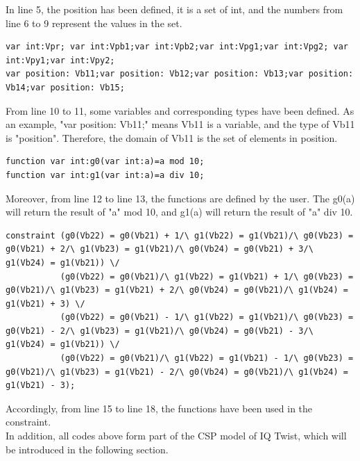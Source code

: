 In line 5, the position has been defined, it is a set of int, and the numbers from line 6 to 9 represent the values in the set.
\begin{lstlisting}[language=minizinc,firstnumber=10]
var int:Vpr; var int:Vpb1;var int:Vpb2;var int:Vpg1;var int:Vpg2; var int:Vpy1;var int:Vpy2;
var position: Vb11;var position: Vb12;var position: Vb13;var position: Vb14;var position: Vb15;
\end{lstlisting}
From line 10 to 11, some variables and corresponding types have been defined. As an example, "var position: Vb11;" means Vb11 is a variable, and the type of Vb11 is "position". Therefore, the domain of Vb11 is the set of elements in position.
\begin{lstlisting}[language=minizinc,firstnumber=12]
function var int:g0(var int:a)=a mod 10;
function var int:g1(var int:a)=a div 10;
\end{lstlisting}
Moreover, from line 12 to line 13, the functions are defined by the user. The g0(a) will return the result of "a" mod 10, and g1(a) will return the result of "a" div 10.
\begin{lstlisting}[language=minizinc,firstnumber=14]
%blue piece2 
constraint (g0(Vb22) = g0(Vb21) + 1/\ g1(Vb22) = g1(Vb21)/\ g0(Vb23) = g0(Vb21) + 2/\ g1(Vb23) = g1(Vb21)/\ g0(Vb24) = g0(Vb21) + 3/\ g1(Vb24) = g1(Vb21)) \/
           (g0(Vb22) = g0(Vb21)/\ g1(Vb22) = g1(Vb21) + 1/\ g0(Vb23) = g0(Vb21)/\ g1(Vb23) = g1(Vb21) + 2/\ g0(Vb24) = g0(Vb21)/\ g1(Vb24) = g1(Vb21) + 3) \/
           (g0(Vb22) = g0(Vb21) - 1/\ g1(Vb22) = g1(Vb21)/\ g0(Vb23) = g0(Vb21) - 2/\ g1(Vb23) = g1(Vb21)/\ g0(Vb24) = g0(Vb21) - 3/\ g1(Vb24) = g1(Vb21)) \/
           (g0(Vb22) = g0(Vb21)/\ g1(Vb22) = g1(Vb21) - 1/\ g0(Vb23) = g0(Vb21)/\ g1(Vb23) = g1(Vb21) - 2/\ g0(Vb24) = g0(Vb21)/\ g1(Vb24) = g1(Vb21) - 3);
\end{lstlisting}
Accordingly, from line 15 to line 18, the functions have been used in the constraint. 
\\In addition, all codes above form part of the CSP model of IQ Twist, which will be introduced in the following section.
